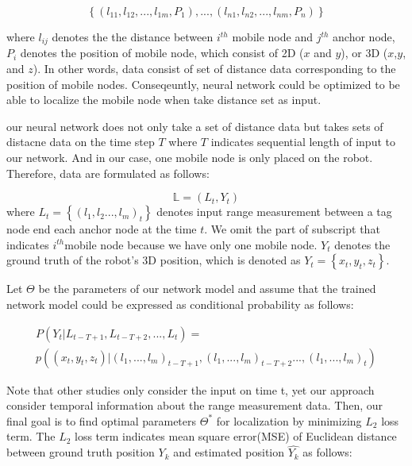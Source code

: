 \documentclass[letterpaper, 10 pt, conference]{ieeeconf}  %
\begin{document}
\begin{equation}
\left\{(l_{11}, l_{12}, ..., l_{1m}, P_1),...,(l_{n1}, l_{n2}, ..., l_{nm}, P_n)\right\}
\end{equation} 


where $l_{ij}$ denotes the the distance between $i^{th}$ mobile node and $j^{th}$ anchor node, $P_i$ denotes the position of mobile node, which consist of 2D ($x$ and $y$), or 3D ($x$,$y$, and $z$). 
In other words, data consist of set of distance data corresponding to the position of mobile nodes. Conseqeuntly, neural network  could be optimized to be able to localize the mobile node when take distance set as input.



our neural network does not only take a set of distance data but takes sets of distacne data on the time step $T$ where $T$ indicates sequential length of input to our network. And in our case, one mobile node is only placed on the robot. Therefore, data are formulated as follows:

\begin{equation}
\mathbb{L} = {(L_t, Y_t)} 
\end{equation}
where $L_t = \left\{(l_1, l_2... , l_m)_t\right\}$ denotes input range measurement between a tag node end each anchor node at the time $t$. We omit the part of subscript that indicates $i^{th}$mobile node because we have only one mobile node. $Y_t$ denotes the ground truth of the robot's 3D position, which is denoted as $Y_t = \left\{x_t, y_t, z_t\right\}$.

Let $\Theta$ be the parameters of our network model and assume that the trained network model could be expressed as conditional probability as follows:

\begin{multline}
P(Y_t|L_{t-T+1}, L_{t-T+2},..., L_t) =\\
p((x_t, y_t, z_t)|(l_1,..., l_m)_{t-T+1},(l_1,..., l_m)_{t-T+2}..., (l_1,..., l_m)_t)
\end{multline}  

Note that other studies only consider the input on time t, yet our approach consider temporal information about the range measurement data. Then, our final goal is to find optimal parameters $\Theta^{*}$ for localization by minimizing $L_2$ loss term. The $L_2$ loss term indicates mean square error(MSE) of Euclidean distance between ground truth position $Y_k$ and estimated position $\hat{Y_k}$ as follows:
\end{document}
